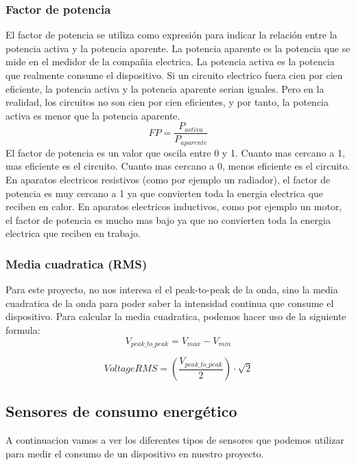 \begin{titlepage}
\subsubsection{Factor de potencia}
El factor de potencia\cite{ref3} se utiliza como expresión para indicar la relación entre la potencia activa y la potencia aparente. La potencia aparente es la potencia que se mide en el medidor de la compañia electrica. La potencia activa es la potencia que realmente consume el dispositivo. Si un circuito electrico fuera cien por cien eficiente, la potencia activa y la potencia aparente serian iguales. Pero en la realidad, los circuitos no son cien por cien eficientes, y por tanto, la potencia activa es menor que la potencia aparente. \\
\begin{equation}
\label{eq:factor_potencia}
FP = \frac{P_{activa}}{P_{aparente}}
\end{equation}
El factor de potencia es un valor que oscila entre 0 y 1. Cuanto mas cercano a 1, mas eficiente es el circuito. Cuanto mas cercano a 0, menos eficiente es el circuito. En aparatos electricos resistivos (como por ejemplo un radiador), el factor de potencia es muy cercano a 1 ya que convierten toda la energia electrica que reciben en calor. En aparatos electricos inductivos, como por ejemplo un motor, el factor de potencia es mucho mas bajo ya que no convierten toda la energia electrica que reciben en trabajo.

\subsubsection{Media cuadratica (RMS)}
Para este proyecto, no nos interesa el el peak-to-peak de la onda, sino la media cuadratica\cite{ref4} de la onda para poder saber la intensidad continua que consume el dispositivo. Para calcular la media cuadratica, podemos hacer uso de la siguiente formula: \\
\begin{equation}
\label{eq:peak_to_peak}
	V_{peak\_to\_peak} = V_{max} - V_{min}
\end{equation}
	
\begin{equation}
\label{eq:media_cuadratica}
Voltage RMS = (\frac{V_{peak\_to\_peak}}{2}) \cdot \sqrt{2}
\end{equation}

\subsection{Sensores de consumo energético}
A continuacion vamos a ver los diferentes tipos de sensores que podemos utilizar para medir el consumo de un dispositivo en nuestro proyecto. \\

\end{titlepage}
